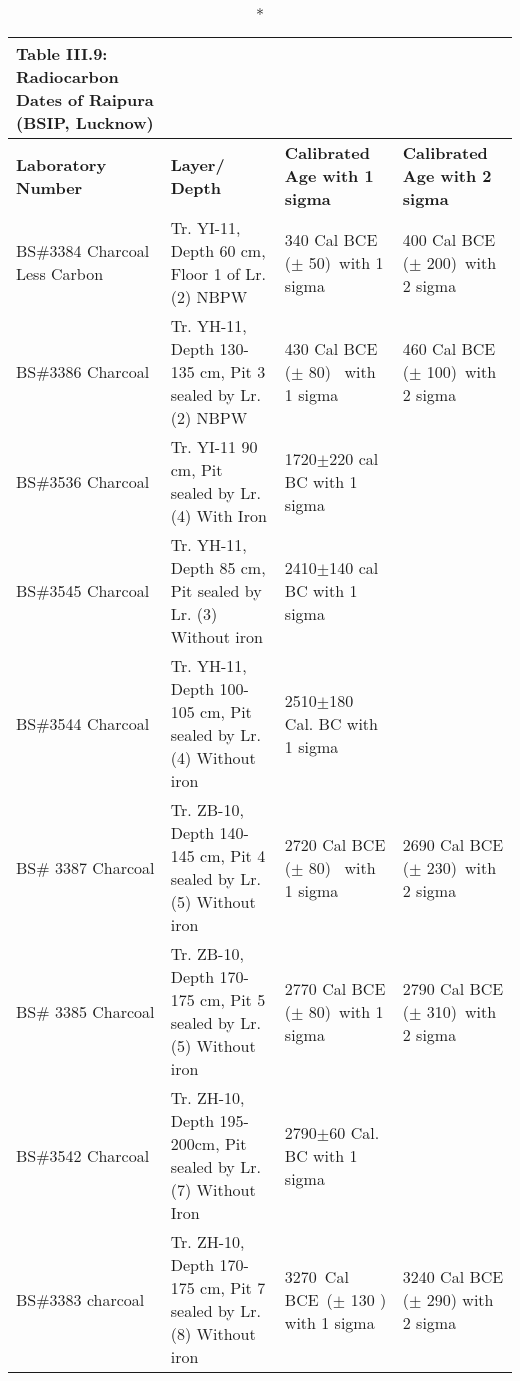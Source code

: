 {\setlength\tabcolsep{2pt}
{\fontsize{7}{9}\selectfont
\begin{longtable}{|p{1.8cm}|p{2.5cm}|p{2cm}|p{2.5cm}|}
\caption*{Table III.9: Radiocarbon Dates of Raipura (BSIP, Lucknow)} \label{table III.9}\\
\hline
\multicolumn{1}{|m{1.8cm}|}{\centering \textbf{Laboratory Number}} &
\multicolumn{1}{m{2.5cm}|}{\centering \textbf{Layer/ Depth}} & 
\multicolumn{1}{m{2cm}|}{\centering \textbf{Calibrated Age with 1 sigma}} & 
\multicolumn{1}{m{2.5cm}|}{\centering \textbf{Calibrated Age with 2 sigma}}\\
\endfirsthead
\hline
\endhead
\hline
\endfoot
\hline
BS\#3384 Charcoal Less Carbon\footnotemark & Tr. YI-11, Depth 60 cm, Floor 1 of Lr. (2) NBPW & 340 Cal BCE ($\pm$ 50) with 1 sigma & 400 Cal BCE ($\pm$ 200) with 2 sigma\\
BS\#3386 Charcoal &  Tr. YH-11, Depth 130- 135 cm, Pit 3 sealed by Lr. (2) NBPW & 430 Cal BCE ($\pm$ 80)  with 1 sigma & 460 Cal BCE ($\pm$ 100) with 2 sigma \\
BS\#3536 Charcoal & Tr. YI-11 90 cm, Pit sealed by Lr. (4) With Iron & 1720$\pm$220 cal BC with 1 sigma & \\
BS\#3545 Charcoal & Tr. YH-11, Depth 85 cm, Pit sealed by Lr. (3) Without iron & 2410$\pm$140 cal BC with 1 sigma & \\
BS\#3544 Charcoal &  Tr. YH-11, Depth 100-105 cm, Pit sealed by Lr. (4) Without iron & 2510$\pm$180 Cal. BC with 1 sigma & \\
BS\# 3387 Charcoal & Tr. ZB-10, Depth 140-145 cm, Pit 4 sealed by Lr.(5) Without iron & 2720 Cal BCE ($\pm$ 80)  with 1 sigma & 2690 Cal BCE ($\pm$ 230) with 2 sigma\\
BS\# 3385 Charcoal  & Tr. ZB-10, Depth 170-175 cm, Pit 5 sealed by Lr.(5) Without iron & 2770 Cal BCE ($\pm$ 80) with 1 sigma & 2790 Cal BCE ($\pm$ 310) with 2 sigma\\
BS\#3542 Charcoal & Tr. ZH-10, Depth 195-200cm, Pit sealed by Lr. (7) Without Iron & 2790$\pm$60 Cal. BC with 1 sigma & \\
BS\#3383 charcoal & Tr. ZH-10, Depth 170- 175 cm, Pit 7 sealed by Lr. (8) Without iron & 3270 Cal BCE ($\pm$ 130 ) with 1 sigma & 3240 Cal BCE ($\pm$ 290) with 2 sigma
\end{longtable}
}}

